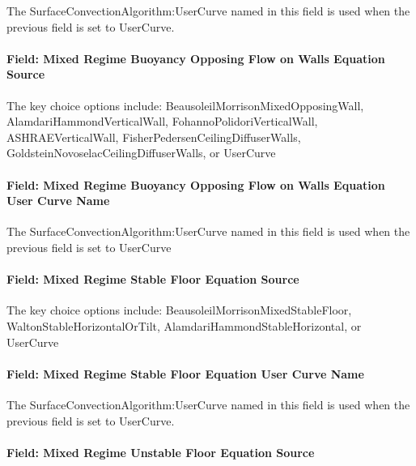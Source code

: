The SurfaceConvectionAlgorithm:UserCurve named in this field is used when the previous field is set to UserCurve.

\paragraph{Field: Mixed Regime Buoyancy Opposing Flow on Walls Equation Source}\label{field-mixed-regime-buoyancy-opposing-flow-on-walls-equation-source}

The key choice options include: BeausoleilMorrisonMixedOpposingWall, AlamdariHammondVerticalWall, FohannoPolidoriVerticalWall, ASHRAEVerticalWall, FisherPedersenCeilingDiffuserWalls, GoldsteinNovoselacCeilingDiffuserWalls, or UserCurve

\paragraph{Field: Mixed Regime Buoyancy Opposing Flow on Walls Equation User Curve Name}\label{field-mixed-regime-buoyancy-opposing-flow-on-walls-equation-user-curve-name}

The SurfaceConvectionAlgorithm:UserCurve named in this field is used when the previous field is set to UserCurve

\paragraph{Field: Mixed Regime Stable Floor Equation Source}\label{field-mixed-regime-stable-floor-equation-source}

The key choice options include: BeausoleilMorrisonMixedStableFloor, WaltonStableHorizontalOrTilt, AlamdariHammondStableHorizontal, or UserCurve

\paragraph{Field: Mixed Regime Stable Floor Equation User Curve Name}\label{field-mixed-regime-stable-floor-equation-user-curve-name}

The SurfaceConvectionAlgorithm:UserCurve named in this field is used when the previous field is set to UserCurve.

\paragraph{Field: Mixed Regime Unstable Floor Equation Source}\label{field-mixed-regime-unstable-floor-equation-source}

